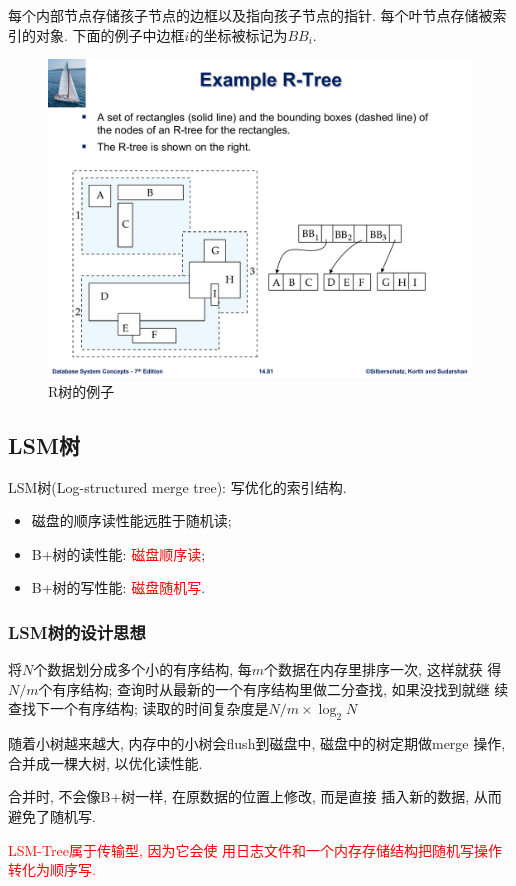 每个内部节点存储孩子节点的边框以及指向孩子节点的指针. 每个叶节点存储被索引的对象. 下面的例子中边框$i$的坐标被标记为$BB_i$.
\begin{figure}[H]
    \centering
    \includegraphics[width=.7\textwidth]{figure/R-tree.pdf}
    \caption{R树的例子}
\end{figure}

\subsection{LSM树}

LSM树(Log-structured merge tree): 写优化的索引结构. \cite{oneilLogstructuredMergetreeLSMtree1996}

\begin{itemize}
    \item 磁盘的顺序读性能远胜于随机读;
    \item B+树的读性能: \textcolor{red}{磁盘顺序读};
    \item B+树的写性能: \textcolor{red}{磁盘随机写}.
\end{itemize}

\subsubsection{LSM树的设计思想}

将$N$个数据划分成多个小的有序结构, 每$m$个数据在内存里排序一次, 这样就获
得$N/m$个有序结构; 查询时从最新的一个有序结构里做二分查找, 如果没找到就继
续查找下一个有序结构; 读取的时间复杂度是$N/m \times \log_2 N$

随着小树越来越大, 内存中的小树会flush到磁盘中, 磁盘中的树定期做merge
操作, 合并成一棵大树, 以优化读性能.

合并时, 不会像B+树一样, 在原数据的位置上修改, 而是直接
插入新的数据, 从而避免了随机写.

\textcolor{red}{LSM-Tree属于传输型, 因为它会使
用日志文件和一个内存存储结构把随机写操作转化为顺序写.}

